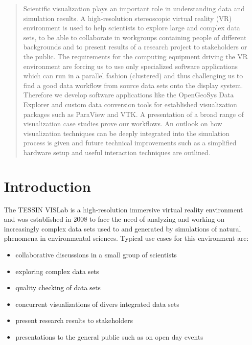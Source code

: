 \date{Received: date / Accepted: date}


\maketitle

\begin{abstract}
Scientific visualization plays an important role in understanding data
and simulation results. A high-resolution stereoscopic virtual reality
(VR) environment is used to help scientists to explore large and complex
data sets, to be able to collaborate in workgroups containing people of
different backgrounds and to present results of a research project to
stakeholders or the public. The requirements for the computing equipment
driving the VR environment are forcing us to use only specialized
software applications which can run in a parallel fashion (clustered)
and thus challenging us to find a good data workflow from source data
sets onto the display system. Therefore we develop software applications
like the OpenGeoSys Data Explorer and custom data conversion tools for
established visualization packages such as ParaView and VTK. A
presentation of a broad range of visualization case studies prove our
workflows. An outlook on how visualization techniques can be deeply
integrated into the simulation process is given and future technical
improvements such as a simplified hardware setup and useful interaction
techniques are outlined.
\end{abstract}


\section{Introduction}
\label{introduction}

The TESSIN VISLab is a high-resolution immersive virtual reality
environment and was established in 2008 to face the need of analyzing
and working on increasingly complex data sets used to and generated by
simulations of natural phenomena in environmental sciences. Typical use
cases for this environment are:

\begin{itemize}
\itemsep1pt\parskip0pt
\item
  collaborative discussions in a small group of scientists
\item
  exploring complex data sets
\item
  quality checking of data sets
\item
  concurrent visualizations of divers integrated data sets
\item
  present research results to stakeholders
\item
  presentations to the general public such as on open day events
\end{itemize}

